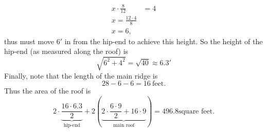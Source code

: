 \documentclass[hints,nooutcomes,noauthor]{ximera}
\begin{document}
\begin{question}
\begin{freeResponse}
\begin{enumerate}
      \begin{align*}
        x\cdot \frac{8}{12} &= 4\\
        x = \frac{12\cdot 4}{8}\\
        x = 6,
      \end{align*}
      thus must move $6'$ in from the hip-end to achieve this height.
      So the height of the hip-end (as measured along the roof) is
      \[
      \sqrt{6^2+4^2} = \sqrt{40} \approx 6.3'
      \]
      Finally, note that the length of the main ridge is
      \[
      28-6-6 = 16~\text{feet}.
      \]
      Thus the area of the roof is
      \[
      2\cdot \underbrace{\frac{16\cdot 6.3}{2}}_{\text{hip-end}} +
      2\left(\underbrace{2\cdot \frac{6\cdot 9}{2} + 16\cdot
        9}_{\text{main roof}}\right) = 496.8 \text{square feet}.
      \]
  \end{enumerate}
\end{freeResponse}


\end{question}
\mynewpage
\end{document}
